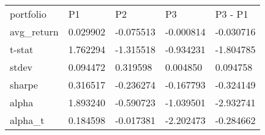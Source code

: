 \begin{tabular}{lllll}
\toprule
\midrule
portfolio & P1 & P2 & P3 & P3 - P1 \\
avg_return & 0.029902 & -0.075513 & -0.000814 & -0.030716 \\
t-stat & 1.762294 & -1.315518 & -0.934231 & -1.804785 \\
stdev & 0.094472 & 0.319598 & 0.004850 & 0.094758 \\
sharpe & 0.316517 & -0.236274 & -0.167793 & -0.324149 \\
alpha & 1.893240 & -0.590723 & -1.039501 & -2.932741 \\
alpha_t & 0.184598 & -0.017381 & -2.202473 & -0.284662 \\
\bottomrule
\end{tabular}
